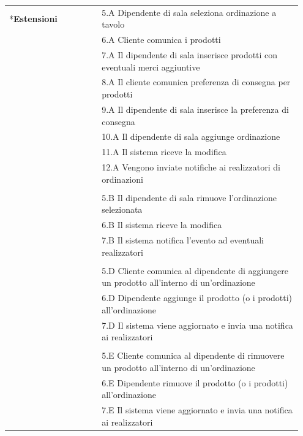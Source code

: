 \begin{longtable}[htbp]{|p{0.3\linewidth}|p{0.65\linewidth}|}
	\newpage
	\multirow{28}*{\textbf{Estensioni}}
	& 5.A Dipendente di sala seleziona ordinazione a tavolo \\
	& 6.A Cliente comunica i prodotti \\
	& 7.A Il dipendente di sala inserisce prodotti con eventuali merci aggiuntive \\
	& 8.A Il cliente comunica preferenza di consegna per prodotti \\
	& 9.A Il dipendente di sala inserisce la preferenza di consegna \\
	& 10.A Il dipendente di sala aggiunge ordinazione \\
	& 11.A Il sistema riceve la modifica \\
	& 12.A Vengono inviate notifiche ai realizzatori di ordinazioni \\
	& \\
	
	& 5.B Il dipendente di sala rimuove l'ordinazione selezionata \\
	& 6.B Il sistema riceve la modifica\\
	& 7.B Il sistema notifica l’evento ad eventuali realizzatori \\
	
	
	& \\
	& 5.D Cliente comunica al dipendente di aggiungere un prodotto all'interno di un'ordinazione \\
	& 6.D Dipendente aggiunge il prodotto (o i prodotti) all'ordinazione \\
	& 7.D Il sistema viene aggiornato e invia una notifica ai realizzatori \\[0.3cm]
	
	& \\
	& 5.E Cliente comunica al dipendente di rimuovere un prodotto all'interno di un'ordinazione \\
	& 6.E Dipendente rimuove il prodotto (o i prodotti) all'ordinazione \\
	& 7.E Il sistema viene aggiornato e invia una notifica ai realizzatori \\[0.3cm]
	


\end{longtable}
